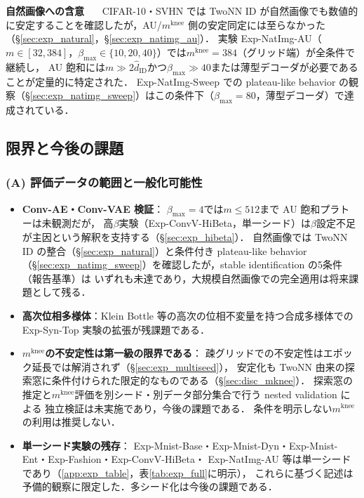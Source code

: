 \documentclass[11pt,a4paper]{jsarticle}
\newcommand{\mknee}{m^{\mathrm{knee}}}
\begin{document}
\textbf{自然画像への含意}~~~
CIFAR-10・SVHN では TwoNN ID が自然画像でも数値的に安定することを確認したが，AU/$\mknee$ 側の安定同定には至らなかった（§\ref{sec:exp_natural}，§\ref{sec:exp_natimg_au}）．
実験 Exp-NatImg-AU（$m \in [32, 384]$，$\beta_{\max} \in \{10,20,40\}$）では$\mknee = 384$（グリッド端）が全条件で継続し，
AU 飽和には$m \gg 2\hat{d}_\mathrm{ID}$かつ$\beta_{\max} \gg 40$または薄型デコーダが必要であることが定量的に特定された．
Exp-NatImg-Sweep での plateau-like behavior の観察（§\ref{sec:exp_natimg_sweep}）はこの条件下（$\beta_{\max}=80$，薄型デコーダ）で達成されている．

\subsection{限界と今後の課題}\label{sec:disc_limitation}

\subsubsection*{(A) 評価データの範囲と一般化可能性}

\begin{itemize}
  \item \textbf{Conv-AE・Conv-VAE 検証}：
        $\beta_{\max}=4$では$m \leq 512$まで AU 飽和プラトーは未観測だが，
        高$\beta$実験（Exp-ConvV-HiBeta，単一シード）は$\beta$設定不足が主因という解釈を支持する（§\ref{sec:exp_hibeta}）．
        自然画像では TwoNN ID の整合（§\ref{sec:exp_natural}）と条件付き plateau-like behavior
        （§\ref{sec:exp_natimg_sweep}）を確認したが，stable identification の5条件（報告基準）は
        いずれも未達であり，大規模自然画像での完全適用は将来課題として残る．
  \item \textbf{高次位相多様体}：Klein Bottle 等の高次の位相不変量を持つ合成多様体での
        Exp-Syn-Top 実験の拡張が残課題である．
  \item \textbf{$\mknee$の不安定性は第一級の限界である}：
        疎グリッドでの不安定性はエポック延長では解消されず（§\ref{sec:exp_multiseed}），
        安定化も TwoNN 由来の探索窓に条件付けられた限定的なものである（§\ref{sec:disc_mknee}）．
        探索窓の推定と$\mknee$評価を別シード・別データ部分集合で行う nested validation による
        独立検証は未実施であり，今後の課題である．
        条件を明示しない$\mknee$の利用は推奨しない．
  \item \textbf{単一シード実験の残存}：
        Exp-Mnist-Base・Exp-Mnist-Dyn・Exp-Mnist-Ent・Exp-Fashion・Exp-ConvV-HiBeta・
        Exp-NatImg-AU 等は単一シードであり（\ref{app:exp_table}，表\ref{tab:exp_full}に明示），
        これらに基づく記述は予備的観察に限定した．多シード化は今後の課題である．
\end{itemize}
\end{document}
